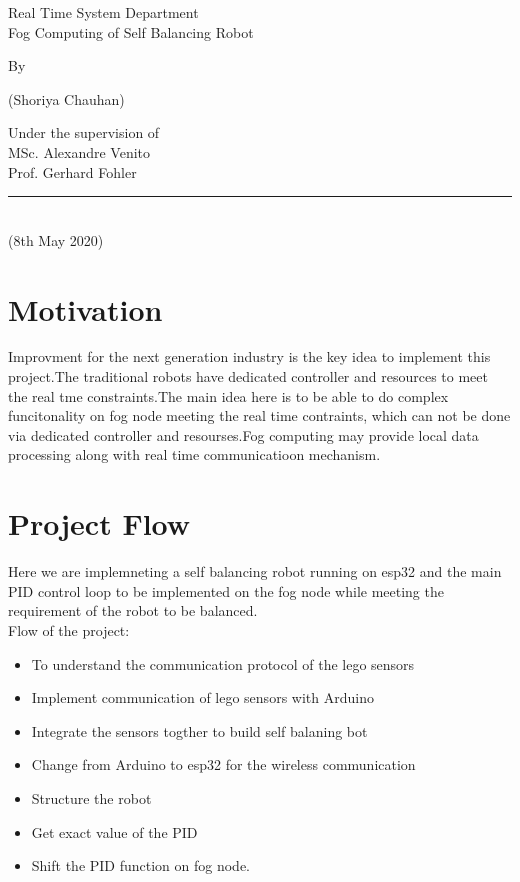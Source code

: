 \documentclass{article}
\begin{document}
	\begin{center}
		\thispagestyle{empty}
		\parskip=14pt%
		\vspace*{3\parskip}%
		
		\large Real Time System Department
				\\
		Fog Computing of Self Balancing Robot
				
		
		
		By
		
		(Shoriya Chauhan)
		
		
		
		Under the supervision of
		\\
		MSc. Alexandre Venito
		\\
		Prof. Gerhard Fohler
		\\
		\rule{7cm}{0.4pt}\\
		
				
		
		
		
		(8th May 2020)
	\end{center}
	\newpage
	


 	\section{Motivation}
 	Improvment for the next generation industry is the key idea to implement this project.The traditional robots have dedicated controller and resources to meet the real tme constraints.The main idea here is to be able to do complex funcitonality on fog node meeting the real time contraints, which can not be done via dedicated controller and resourses.Fog computing may provide local data processing along with real time communicatioon mechanism.
 	
 	\section{Project Flow}
	Here we are implemneting a self balancing robot running on esp32 and the main PID control loop to be implemented on the fog node while meeting the requirement of the robot to be balanced. 
	\\
	Flow of the project:
	\begin{itemize}
	\item To understand the communication protocol of the lego sensors
	\item Implement communication of lego sensors with Arduino
	\item Integrate the sensors togther to build self balaning bot
	\item Change from Arduino to esp32 for the wireless communication
	\item Structure the robot
	\item Get exact value of the PID
	\item Shift the PID function on fog node. 
	 \end{itemize}	
	 
\end{document}
